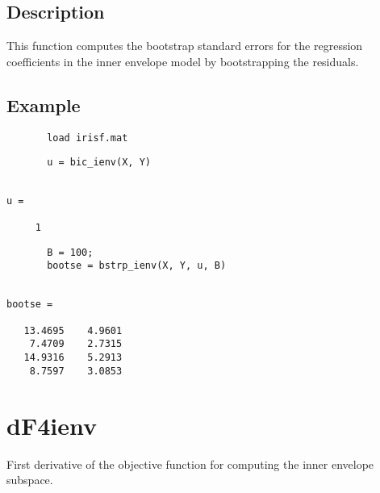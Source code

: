 \documentclass[a4paper,11pt,openany]{memoir}
\begin{document}
\subsection*{Description}

\begin{par}
This function computes the bootstrap standard errors for the regression coefficients in the inner envelope model by bootstrapping the residuals.
\end{par} \vspace{1em}


\subsection*{Example}


\begin{verbatim}       load irisf.mat\end{verbatim}
    
\begin{verbatim}       u = bic_ienv(X, Y)\end{verbatim}
        \color{lightgray}\ttfamily \begin{verbatim}

u =

     1

\end{verbatim} \rmfamily
\color{black}
\begin{verbatim}       B = 100;
       bootse = bstrp_ienv(X, Y, u, B)\end{verbatim}
    
        \color{lightgray}\ttfamily \begin{verbatim}

bootse =

   13.4695    4.9601
    7.4709    2.7315
   14.9316    5.2913
    8.7597    3.0853

\end{verbatim} \rmfamily
\color{black}

\newpage


\rmfamily
\color{black}\section{dF4ienv}

\begin{par}
First derivative of the objective function for computing the inner envelope subspace.
\end{par} \vspace{1em}
\end{document}
